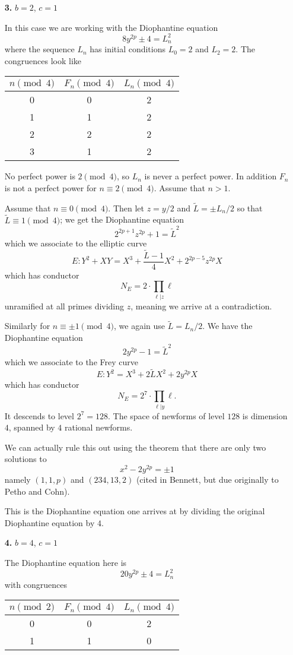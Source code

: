 \documentclass[12pt]{article}
\begin{document}
\begin{enumerate}
\item[\textbf{3.}] $b = 2$, $c = 1$

In this case we are working with the Diophantine equation
\[ 8y^{2p} \pm 4 = L_n^2 \]
where the sequence $L_n$ has initial conditions $L_0 = 2$ and $L_2 = 2$.  The congruences look like
\begin{center}
\begin{tabular}{c| c c}
$n \pmod{4}$ & $F_n \pmod{4}$ & $L_n \pmod{4}$ \\ \hline \hline
0 & 0 & 2 \\
1 & 1 &  2 \\
2 & 2 & 2\\
3 & 1 & 2 \\ \hline \hline
\end{tabular}
\end{center}

No perfect power is $2 \pmod{4}$, so $L_n$ is never a perfect power.  In addition $F_n$ is not a perfect power for $n \equiv 2 \pmod{4}$.  Assume that $n > 1$.

Assume that $n \equiv 0 \pmod{4}$.  Then let $z = y/2$ and $\tilde{L} = \pm L_n/2$ so that $\tilde{L} \equiv 1 \pmod{4}$; we get the Diophantine equation
\[ 2^{2p+1}z^{2p} + 1 = \tilde{L}^2 \]
which we associate to the elliptic curve
\[ E: Y^2 +XY = X^3 + \frac{\tilde{L}-1}{4} X^2 + 2^{2p-5}z^{2p}X \]
which has conductor 
\[N_E = 2 \cdot \prod_{\ell | z} \ell \]
unramified at all primes dividing $z$, meaning we arrive at a contradiction.  

Similarly for $ n \equiv \pm 1 \pmod{4}$, we again use $\tilde{L} = L_n/2$.  We have the Diophantine equation
\[ 2y^{2p} -1 = \tilde{L}^2 \] 
which we associate to the Frey curve
\[ E: Y^2 = X^3 + 2\tilde{L}X^2+2y^{2p}X \]
which has conductor
\[N_E = 2^7 \cdot \prod_{\ell |y} \ell. \]
It descends to level $2^7 = 128$.  The space of newforms of level $128$ is dimension $4$, spanned by $4$ rational newforms.   

We can actually rule this out using the theorem that there are only two solutions to
\[ x^2 - 2y^{2p} = \pm 1\]
namely $(1,1,p)$ and $(234, 13, 2)$ (cited in Bennett, but due originally to Petho and Cohn).

This is the Diophantine equation one arrives at by dividing the original Diophantine equation by $4$.


\item[\textbf{4.}] $b = 4$, $c = 1$

The Diophantine equation here is 
\[ 20y^{2p} \pm4 = L_n^2\]
with congruences
\begin{center}
\begin{tabular}{c| c c}
$n \pmod{2}$ & $F_n \pmod{4}$ & $L_n \pmod{4}$ \\ \hline \hline
0 & 0 & 2 \\
1 & 1 &  0 \\ \hline \hline
\end{tabular}
\end{center}


\end{enumerate}
\end{document}
